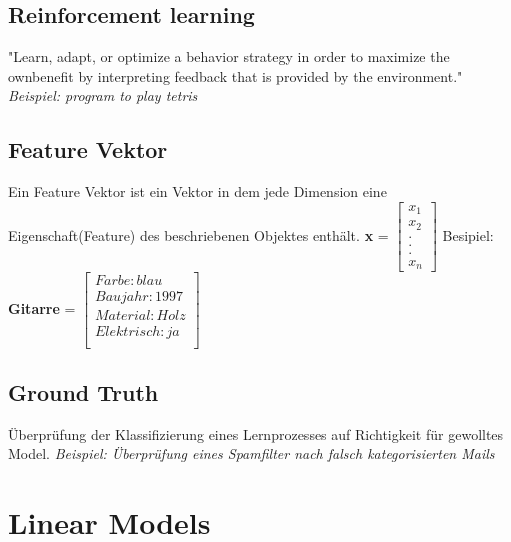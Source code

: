 \documentclass[11pt,a4paper]{article}
\begin{document}
\begin{flushleft}
\subsection{Reinforcement learning}
    "Learn, adapt, or optimize a behavior strategy in order to maximize the ownbenefit by interpreting feedback that is provided by the environment."
    \textit{Beispiel: program to play tetris}

\subsection{Feature Vektor}
    Ein Feature Vektor ist ein Vektor in dem jede Dimension eine Eigenschaft(Feature) des beschriebenen Objektes enthält.\newline
    \textbf{x} =
    $\begin{bmatrix}
    x_1\\
    x_2\\
    .\\
    .\\
    .\\
    x_n
    \end{bmatrix}$
    \quad Besipiel: \textbf{Gitarre} = 
    $\begin{bmatrix}
    Farbe: blau\\
    Baujahr: 1997\\
    Material: Holz\\
    Elektrisch: ja\\
    \end{bmatrix}$


\subsection{Ground Truth}
Überprüfung der Klassifizierung eines Lernprozesses auf Richtigkeit für gewolltes Model.\newline
\textit{Beispiel: Überprüfung eines Spamfilter nach falsch kategorisierten Mails}

\section{Linear Models}

\end{flushleft}
\end{document}
